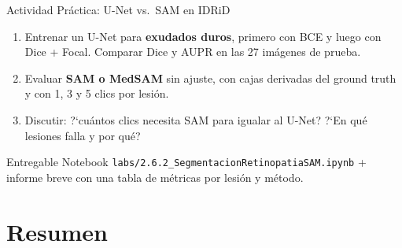 \documentclass[aspectratio=169, 10pt]{beamer}
\begin{document}
\begin{frame}{Actividad Pr\'actica: U-Net vs.\ SAM en IDRiD}

	\begin{enumerate}
		\item Entrenar un U-Net para \textbf{exudados duros}, primero con BCE y luego con Dice + Focal. Comparar Dice y AUPR en las 27 im\'agenes de prueba.
		      \vspace{0.25cm}
		\item Evaluar \textbf{SAM o MedSAM} sin ajuste, con cajas derivadas del ground truth y con 1, 3 y 5 clics por lesi\'on.
		      \vspace{0.25cm}
		\item Discutir: ?`cu\'antos clics necesita SAM para igualar al U-Net? ?`En qu\'e lesiones falla y por qu\'e?
	\end{enumerate}

	\vspace{0.3cm}

	\begin{block}{Entregable}
		Notebook \texttt{labs/2.6.2\_SegmentacionRetinopatiaSAM.ipynb} + informe breve con una tabla de m\'etricas por lesi\'on y m\'etodo.
	\end{block}

\end{frame}

\section{Resumen}
\end{document}
